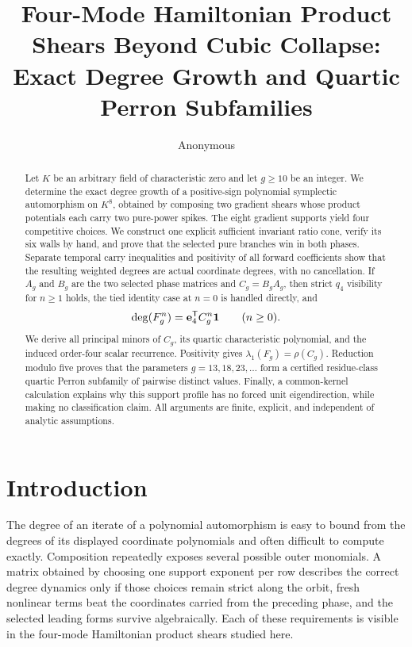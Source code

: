 \documentclass[11pt]{article}
\title{Four-Mode Hamiltonian Product Shears Beyond Cubic Collapse: Exact Degree Growth and Quartic Perron Subfamilies}
\author{Anonymous}
\date{}
\theoremstyle{remark}
\numberwithin{equation}{section}
\begin{document}
\maketitle

\begin{abstract}
Let \(K\) be an arbitrary field of characteristic zero and let \(g\geq10\) be an integer.
We determine the exact degree growth of a positive-sign polynomial
symplectic automorphism on \(K^8\), obtained by composing two gradient
shears whose product potentials each carry two pure-power spikes.  The eight
gradient supports yield four competitive choices.  We construct one
explicit sufficient invariant ratio cone, verify its six walls by hand, and
prove that the selected pure branches win in both phases.  Separate temporal
carry inequalities and positivity of all forward coefficients show that the
resulting weighted degrees are actual coordinate degrees, with no
cancellation.  If \(A_g\) and \(B_g\) are the two selected phase matrices and
\(C_g=B_gA_g\), then strict \(q_4\) visibility for \(n\geq1\) holds,
the tied identity case at \(n=0\) is handled directly, and
\[
\deg(F_g^n)=\mathbf{e}_4^{\mathsf{T}}C_g^n\mathbf{1}
\qquad(n\geq0).
\]
We derive all principal minors of \(C_g\), its quartic characteristic
polynomial, and the induced order-four scalar recurrence.  Positivity gives
\(\lambda_1(F_g)=\rho(C_g)\).  Reduction modulo five proves that the
parameters \(g=13,18,23,\ldots\) form a certified residue-class quartic Perron subfamily
of pairwise distinct values.  Finally, a common-kernel
calculation explains why this support profile has no forced unit
eigendirection, while making no classification claim.
All arguments are finite, explicit, and independent of analytic assumptions.
\end{abstract}

\section{Introduction}\label{sec:introduction}

The degree of an iterate of a polynomial automorphism is easy to bound from
the degrees of its displayed coordinate polynomials and often difficult to
compute exactly.  Composition repeatedly exposes several possible outer
monomials.  A matrix obtained by choosing one support exponent per row
describes the correct degree dynamics only if those choices remain strict
along the orbit, fresh nonlinear terms beat the coordinates carried from the
preceding phase, and the selected leading forms survive algebraically.  Each
of these requirements is visible in the four-mode Hamiltonian product
shears studied here.
\end{document}
